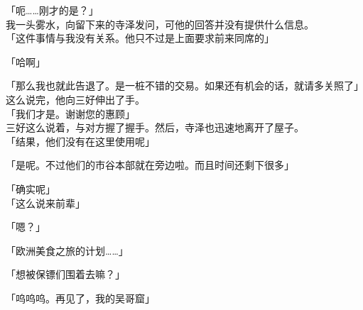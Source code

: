 「呃……刚才的是？」\\

我一头雾水，向留下来的寺泽发问，可他的回答并没有提供什么信息。\\

「这件事情与我没有关系。他只不过是上面要求前来同席的」

「哈啊」

「那么我也就此告退了。是一桩不错的交易。如果还有机会的话，就请多关照了」\\

这么说完，他向三好伸出了手。\\

「我们才是。谢谢您的惠顾」\\

三好这么说着，与对方握了握手。然后，寺泽也迅速地离开了屋子。\\

「结果，他们没有在这里使用呢」

「是呢。不过他们的市谷本部就在旁边啦。而且时间还剩下很多」

「确实呢」\\

「这么说来前辈」

「嗯？」

「欧洲美食之旅的计划……」

「想被保镖们围着去嘛？」

「呜呜呜。再见了，我的吴哥窟」\\

